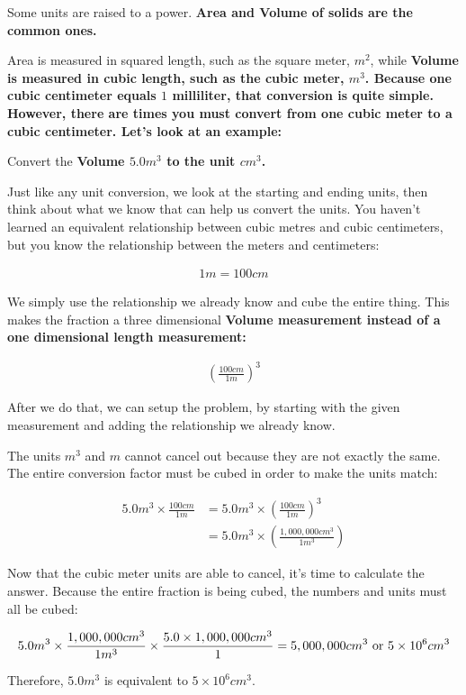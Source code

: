 \begin{example} Some units are raised to a power.
	\bf{Area} and \bf{Volume} of solids are the common ones.

	Area is measured in squared length, such as the square meter, $m^2$, while
	\bf{Volume} is measured in cubic length, such as the cubic meter, $m^3$.
	Because one cubic centimeter equals $1$ milliliter, that conversion is quite
	simple. However, there are times you must convert from one cubic meter to a
	cubic centimeter. Let's look at an example:

	Convert the \bf{Volume} $5.0 m^3$ to the unit $cm^3$.

	Just like any unit conversion, we look at the starting and ending units, then
	think about what we know that can help us convert the units. You haven't
	learned an equivalent relationship  between cubic metres and cubic
	centimeters, but you know the relationship between the meters and
	centimeters:

    \begin{align}
    	1 m = 100 cm
    \end{align}

	We simply use the relationship we already know and cube the entire thing.
	This makes the fraction a three dimensional \bf{Volume} measurement
	instead of a one dimensional length measurement:

    \begin{align}
    	\left( \frac{100 cm}{1 m}\right)^3
    \end{align}

	After we do that, we can setup the problem, by starting with the given
	measurement and adding the relationship we already know.

	The units $m^3$ and $m$ cannot cancel out because they are not exactly the same. The entire conversion factor must be cubed in order to make the units match:

	\begin{align}
		5.0 m^3 \times \frac{100 cm}{1 m} &= 5.0 m^3 \times \left( \frac{100 cm}{1 m} \right)^3 \\
		                                  &= 5.0 m^3 \times \left( \frac{1,000,000 cm^3}{1 m^3} \right)
	\end{align}

	Now that the cubic meter units are able to cancel, it's time to calculate the answer. Because the entire fraction is being cubed, the numbers and units must all be cubed:

	\begin{align}
		5.0 m^3 \times \frac{1,000,000 cm^3}{1 m^3} \times \frac{5.0 \times 1,000,000 cm^3}{1} = 5,000,000 cm^3 \rm{ or } 5 \times 10^6 cm^3
	\end{align}

	Therefore, $5.0 m^3$ is equivalent to $5 \times 10^6 cm^3$.
\end{example}

\newpage
